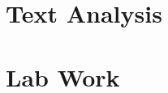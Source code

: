 









\graphicspath{{lectures/}{lectures/text_analysis/}}
\part{Text Analysis}


\graphicspath{{labs/}}
\part{Lab Work}




